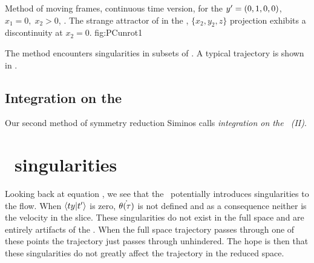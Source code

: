 {%
{}{
Method of moving frames, continuous time version, for the
${y'}=(0,1,0,0)$,
$x_1=0,\;x_2>0$, \slice. The strange attractor of
 in the \reducedsp,
$\{x_2,y_2,z\}$ projection exhibits a discontinuity at
$x_2=0$.
}
{fig:PCunrot1}

The method encounters singularities in
subsets of \statesp{}.
A typical trajectory is shown in .

\subsection{Integration on the \slice}

Our second method of symmetry reduction Siminos
 calls {\em integration on the
\slice\ (II)}.

\fi
	
	
\section{\Slice\ singularities}
\label{sect:sliceSing}

Looking back at equation , we see that the \mslices\ potentially introduces singularities to the flow. When $\left\langle {\ensuremath{t}{\ensuremath{y}}}|{t'_{}} \right\rangle$ is zero, $\dot{{\bf \theta}(\tau)}$ is not defined and as a consequence neither is the velocity in the slice. These singularities do not exist in the full space and are entirely artifacts of the \mslices. When the full space trajectory passes through one of these points the trajectory just passes through unhindered. The hope is then that these singularities do not greatly affect the trajectory in the reduced space.

	\ifarticle
	\else
	
}
